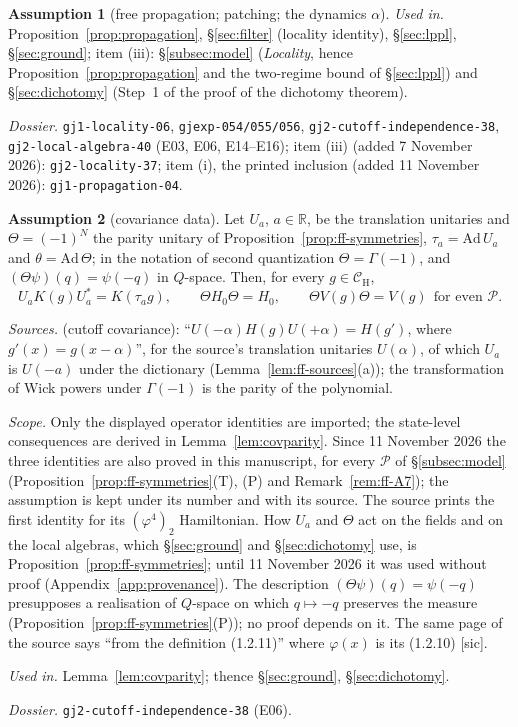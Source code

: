 \documentclass[11pt,a4paper]{article}
\theoremstyle{plain}
\theoremstyle{definition}
\newtheorem{assumption}{Assumption}
\theoremstyle{plain}
\theoremstyle{definition}
\newcommand{\R}{\mathbb{R}}
\newcommand{\CH}{\mathcal{C}_{\mathrm H}}
\begin{document}
\begin{assumption}[free propagation; patching; the dynamics $\alpha$]
\emph{Used in.} Proposition~\ref{prop:propagation}, \S\ref{sec:filter} (locality identity),
\S\ref{sec:lppl}, \S\ref{sec:ground}; item (iii): \S\ref{subsec:model} (\emph{Locality}, hence
Proposition~\ref{prop:propagation} and the two-regime bound of \S\ref{sec:lppl}) and
\S\ref{sec:dichotomy} (Step~1 of the proof of the dichotomy theorem).

{\raggedright\emph{Dossier.} \texttt{gj1-locality-06}, \texttt{gjexp-054/055/056},
\texttt{gj2-cutoff-independence-38}, \texttt{gj2-local-algebra-40} (E03, E06,
E14--E16); item (iii) (added 7 November 2026): \texttt{gj2-locality-37}; item (i), the
printed inclusion (added 11 November 2026): \texttt{gj1-propagation-04}.\par}
\end{assumption}

\begin{assumption}[covariance data]\label{A:covar}
Let $U_a$, $a\in\R$, be the translation unitaries and $\Theta=(-1)^N$ the parity unitary of
Proposition~\ref{prop:ff-symmetries}, $\tau_a=\mathrm{Ad}\,U_a$ and
$\theta=\mathrm{Ad}\,\Theta$; in the notation of second quantization $\Theta=\Gamma(-1)$, and
$(\Theta\psi)(q)=\psi(-q)$ in $Q$-space.  Then, for every
$g\in\CH$,
\[
 U_aK(g)U_a^*=K(\tau_ag),\qquad \Theta H_0\Theta=H_0,\qquad
 \Theta V(g)\Theta=V(g)\ \ \text{for even }\mathscr P .
\]

\emph{Sources.} \cite[p.~398]{GJ2} (cutoff covariance): ``$U(-\alpha)H(g)U(+\alpha)=H(g')$,
where $g'(x)=g(x-\alpha)$'', for the source's translation unitaries $U(\alpha)$, of which
$U_a$ is $U(-a)$ under the dictionary (Lemma~\ref{lem:ff-sources}(a)); the transformation of
Wick powers under $\Gamma(-1)$ is the parity of the polynomial.

\emph{Scope.} Only the displayed operator identities are imported; the state-level
consequences are derived in Lemma~\ref{lem:covparity}.  Since 11 November 2026 the three
identities are also proved in this manuscript, for every $\mathscr P$ of \S\ref{subsec:model}
(Proposition~\ref{prop:ff-symmetries}(T), (P) and Remark~\ref{rem:ff-A7}); the assumption is
kept under its number and with its source.  The source prints the first identity for its
$(\varphi^4)_2$ Hamiltonian.  How $U_a$ and $\Theta$ act on the fields and on the local
algebras, which \S\ref{sec:ground} and \S\ref{sec:dichotomy} use, is
Proposition~\ref{prop:ff-symmetries}; until 11 November 2026 it was used without proof
(Appendix~\ref{app:provenance}).  The description $(\Theta\psi)(q)=\psi(-q)$ presupposes a
realisation of $Q$-space on which $q\mapsto-q$ preserves the measure
(Proposition~\ref{prop:ff-symmetries}(P)); no proof depends on it.  The same page of the
source says ``from the definition (1.2.11)'' where $\varphi(x)$ is its (1.2.10) [sic].

\emph{Used in.} Lemma~\ref{lem:covparity}; thence \S\ref{sec:ground},
\S\ref{sec:dichotomy}.

{\raggedright\emph{Dossier.} \texttt{gj2-cutoff-independence-38} (E06).\par}
\end{assumption}
\end{document}
